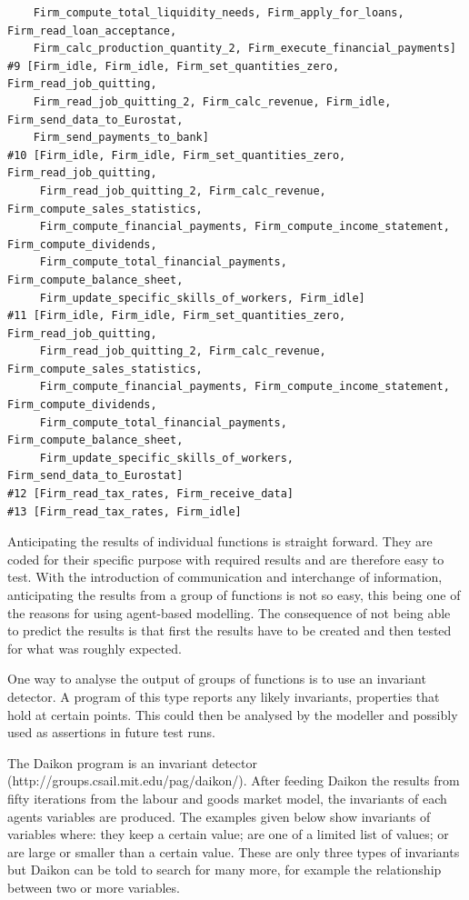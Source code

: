 {\begin{verbatim}
    Firm_compute_total_liquidity_needs, Firm_apply_for_loans, Firm_read_loan_acceptance,
    Firm_calc_production_quantity_2, Firm_execute_financial_payments]
#9 [Firm_idle, Firm_idle, Firm_set_quantities_zero, Firm_read_job_quitting,
    Firm_read_job_quitting_2, Firm_calc_revenue, Firm_idle, Firm_send_data_to_Eurostat,
    Firm_send_payments_to_bank]
#10 [Firm_idle, Firm_idle, Firm_set_quantities_zero, Firm_read_job_quitting,
     Firm_read_job_quitting_2, Firm_calc_revenue, Firm_compute_sales_statistics,
     Firm_compute_financial_payments, Firm_compute_income_statement, Firm_compute_dividends,
     Firm_compute_total_financial_payments, Firm_compute_balance_sheet,
     Firm_update_specific_skills_of_workers, Firm_idle]
#11 [Firm_idle, Firm_idle, Firm_set_quantities_zero, Firm_read_job_quitting,
     Firm_read_job_quitting_2, Firm_calc_revenue, Firm_compute_sales_statistics,
     Firm_compute_financial_payments, Firm_compute_income_statement, Firm_compute_dividends,
     Firm_compute_total_financial_payments, Firm_compute_balance_sheet, 
     Firm_update_specific_skills_of_workers, Firm_send_data_to_Eurostat]
#12 [Firm_read_tax_rates, Firm_receive_data]
#13 [Firm_read_tax_rates, Firm_idle]
\end{verbatim}
}

Anticipating the results of individual functions is straight forward. They are
coded for their specific purpose with required results and are therefore easy to
test. With the introduction of communication and interchange of information,
anticipating the results from a group of functions is not so easy, this being
one of the reasons for using agent-based modelling. The consequence of not being
able to predict the results is that first the results have to be created and then
tested for what was roughly expected.

One way to analyse the output of groups of functions is to use an invariant
detector. A program of this type reports any likely invariants, properties that
hold at certain points. This could then be analysed by the modeller and possibly
used as assertions in future test runs.

The Daikon program is an invariant detector \cite{DAIKON:2007}
(http://groups.csail.mit.edu/pag/daikon/). After feeding Daikon the results
from fifty iterations from the labour and goods market model, the invariants
of each agents variables are produced. The examples given below show invariants
of variables where: they keep a certain value; are one of a limited list of
values; or are large or smaller than a certain value. These are only three
types of invariants but Daikon can be told to search for many more, for example
the relationship between two or more variables.

